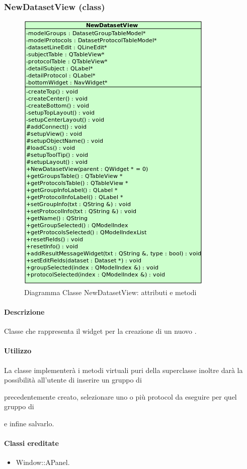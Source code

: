 \subsubsection{NewDatasetView (class)}
\label{speNdatV}
\begin{figure}[!h]
\centering
			\includegraphics[width=0.5\linewidth]{./Content/Immagini/view/NewDatasetView.png}
			\caption{ Diagramma Classe NewDatasetView: attributi e metodi}
			\label{cl_ndatview}
\end{figure}
\paragraph{Descrizione \\}
Classe che rappresenta il widget per la creazione di un nuovo \dataset{}.
\paragraph{Utilizzo\\}
La classe implementerà i metodi virtuali puri della superclasse inoltre darà la possibilità all'utente di inserire un gruppo di \subject{} precedentemente creato, selezionare uno o più protocol\g{} da eseguire per quel gruppo di \subject{} e infine salvarlo.
\paragraph{Classi ereditate\\}
\begin{itemize}
\item Window::APanel.
\end{itemize}
